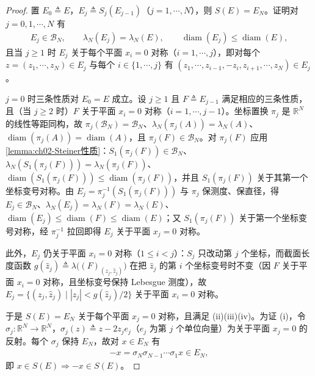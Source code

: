 \documentclass[../../main.tex]{subfiles}%
\begin{document}
\begin{proof}
置 $E_0\triangleq E$，$E_j\triangleq S_j(E_{j-1})$（$j=1,\cdots ,N$），则 $S(E)=E_N$。证明对 $j=0,1,\cdots ,N$ 有
\begin{align*}
E_j\in\mathscr B_N,\qquad\lambda_N(E_j)=\lambda_N(E),\qquad\operatorname{diam}(E_j)\leqslant\operatorname{diam}(E),
\end{align*}
且当 $j\geqslant1$ 时 $E_j$ 关于每个平面 $x_i=0$ 对称（$i=1,\cdots ,j$），即对每个 $z=(z_1,\cdots ,z_N)\in E_j$ 与每个 $i\in\{1,\cdots ,j\}$ 有 $(z_1,\cdots ,z_{i-1},-z_i,z_{i+1},\cdots ,z_N)\in E_j$。

$j=0$ 时三条性质对 $E_0=E$ 成立。设 $j\geqslant1$ 且 $F\triangleq E_{j-1}$ 满足相应的三条性质，且（当 $j\geqslant2$ 时）$F$ 关于平面 $x_i=0$ 对称（$i=1,\cdots ,j-1$）。坐标置换 $\pi_j$ 是 $\mathbb R^N$ 的线性等距同构，故 $\pi_j(\mathscr B_N)=\mathscr B_N$、$\lambda_N(\pi_j(A))=\lambda_N(A)$、$\operatorname{diam}(\pi_j(A))=\operatorname{diam}(A)$，且 $\pi_j(F)\in\mathscr B_N$。对 $\pi_j(F)$ 应用\cref{lemma:ch02-Steiner性质}：$S_1(\pi_j(F))\in\mathscr B_N$、$\lambda_N(S_1(\pi_j(F)))=\lambda_N(\pi_j(F))$、$\operatorname{diam}(S_1(\pi_j(F)))\leqslant\operatorname{diam}(\pi_j(F))$，并且 $S_1(\pi_j(F))$ 关于其第一个坐标变号对称。由 $E_j=\pi_j^{-1}(S_1(\pi_j(F)))$ 与 $\pi_j$ 保测度、保直径，得 $E_j\in\mathscr B_N$、$\lambda_N(E_j)=\lambda_N(F)=\lambda_N(E)$、$\operatorname{diam}(E_j)\leqslant\operatorname{diam}(F)\leqslant\operatorname{diam}(E)$；又 $S_1(\pi_j(F))$ 关于第一个坐标变号对称，经 $\pi_j^{-1}$ 拉回即得 $E_j$ 关于平面 $x_j=0$ 对称。

此外，$E_j$ 仍关于平面 $x_i=0$ 对称（$1\leqslant i<j$）：$S_j$ 只改动第 $j$ 个坐标，而截面长度函数 $g(\hat z_j)\triangleq\lambda\bigl((F)_{(z_j,\hat z_j)}\bigr)$ 在把 $\hat z_j$ 的第 $i$ 个坐标变号时不变（因 $F$ 关于平面 $x_i=0$ 对称，且坐标变号保持 Lebesgue 测度），故 $E_j=\{(z_j,\hat z_j)\mid|z_j|<g(\hat z_j)/2\}$ 关于平面 $x_i=0$ 对称。

于是 $S(E)=E_N$ 关于每个平面 $x_j=0$ 对称，且满足 (ii)(iii)(iv)。为证 (i)，令 $\sigma_j:\mathbb R^N\to\mathbb R^N$，$\sigma_j(z)\triangleq z-2z_je_j$（$e_j$ 为第 $j$ 个单位向量）为关于平面 $x_j=0$ 的反射。每个 $\sigma_j$ 保持 $E_N$，故对 $x\in E_N$ 有
\begin{align*}
-x=\sigma_N\sigma_{N-1}\cdots\sigma_1x\in E_N,
\end{align*}
即 $x\in S(E)\Rightarrow-x\in S(E)$。
\end{proof}
\end{document}
